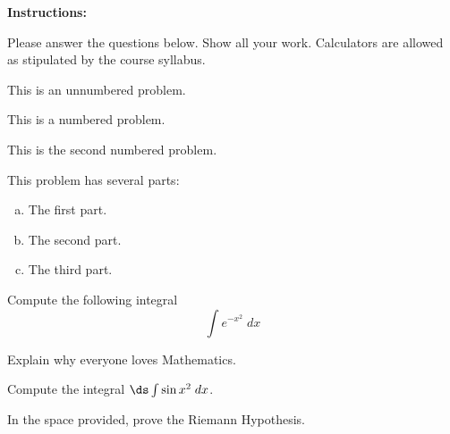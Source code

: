 \documentclass[11pt,letterpaper]{article}
\begin{document}
\textbf{Instructions:} \par \noindent Please answer the questions below. Show all your work. Calculators are allowed as stipulated by the course syllabus. \pspace



\prob This is an unnumbered problem. \pspace


\problem This is a numbered problem. \vspace{1.5cm}


 This is the second numbered problem. \vfill


\problem This problem has several parts:
	\begin{enumerate}[(a)]
	\item The first part.
	\item The second part. 
	\item The third part. 
	\end{enumerate} \vspace{6cm}



\newpage



\problem Compute the following integral
	\[
	\int e^{-x^2} \;dx
	\] \vspace{3cm}


\problem Explain why everyone loves Mathematics. \pspace


\problem Compute the integral $\ds \int \sin x^2 \;dx$. \vspace{2cm}


\problem In the space provided, prove the Riemann Hypothesis.
\end{document}

